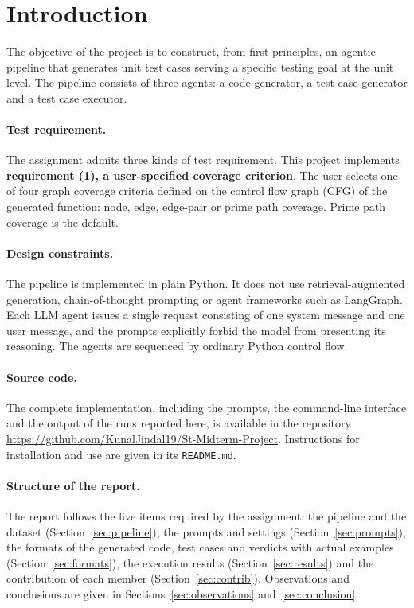 \documentclass[11pt, a4paper]{article}
\begin{document}
\tableofcontents
\newpage

\section{Introduction}
\label{sec:intro}

The objective of the project is to construct, from first principles, an agentic pipeline that generates unit test cases serving a specific testing goal at the unit level. The pipeline consists of three agents: a code generator, a test case generator and a test case executor.

\paragraph{Test requirement.} The assignment admits three kinds of test requirement. This project implements \textbf{requirement (1), a user-specified coverage criterion}. The user selects one of four graph coverage criteria defined on the control flow graph (CFG) of the generated function: node, edge, edge-pair or prime path coverage. Prime path coverage is the default.

\paragraph{Design constraints.} The pipeline is implemented in plain Python. It does not use retrieval-augmented generation, chain-of-thought prompting or agent frameworks such as LangGraph. Each LLM agent issues a single request consisting of one system message and one user message, and the prompts explicitly forbid the model from presenting its reasoning. The agents are sequenced by ordinary Python control flow.

\paragraph{Source code.} The complete implementation, including the prompts, the command-line interface and the output of the runs reported here, is available in the repository \url{https://github.com/KunalJindal19/St-Midterm-Project}. Instructions for installation and use are given in its \texttt{README.md}.

\paragraph{Structure of the report.} The report follows the five items required by the assignment: the pipeline and the dataset (Section~\ref{sec:pipeline}), the prompts and settings (Section~\ref{sec:prompts}), the formats of the generated code, test cases and verdicts with actual examples (Section~\ref{sec:formats}), the execution results (Section~\ref{sec:results}) and the contribution of each member (Section~\ref{sec:contrib}). Observations and conclusions are given in Sections~\ref{sec:observations} and~\ref{sec:conclusion}.
\end{document}
